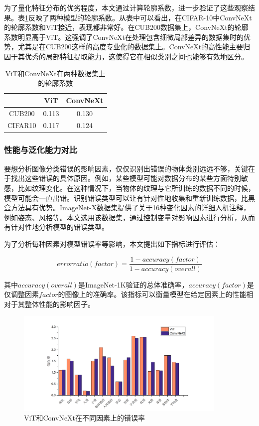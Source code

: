 为了量化特征分布的优劣程度，本文通过计算轮廓系数，进一步验证了这些观察结果。表\ref{tab:Silhouette Coefficient}反映了两种模型的轮廓系数。从表中可以看出，在CIFAR-10中ConvNeXt的轮廓系数和ViT接近，表现都非常好。在CUB200数据集上，ConvNeXt的轮廓系数明显高于ViT。这强调了ConvNeXt在处理包含细微局部差异的数据集时的优势，尤其是在CUB200这样的高度专业化的数据集上。ConvNeXt的高性能主要归因于其优秀的局部特征提取能力，这使得它在相似类别之间也能够有效地区分。

\begin{table}[H]
    \tabcolsep=40pt
    \centering
    \caption{ViT和ConvNeXt在两种数据集上的轮廓系数}
    \label{tab:Silhouette Coefficient}
    \begin{tabular}{c|cc}
          \hline
         &ViT  & ConvNeXt  \\
         \hline
         CUB200 &  0.113 & 0.130   \\
         CIFAR10 & 0.117 & 0.124 \\
         \hline
    \end{tabular}
\end{table}

\subsubsection{性能与泛化能力对比}

要想分析图像分类错误的影响因素，仅仅识别出错误的物体类别远远不够，关键在于找出这些错误的具体原因。例如，某些模型可能对数据分布的某些方面特别敏感，比如纹理变化。在这种情况下，当物体的纹理与它所训练的数据不同的时候，模型可能会一直出错。识别错误类型可以让有针对性地收集和重新训练数据，比黑盒方法具有优势。ImageNet-X数据集提供了关于16种变化因素的详细人机注释，例如姿态、风格等。本文选用该数据集，通过控制变量对影响因素进行分析，从而有针对性地分析模型的错误类型。

为了分析每种因素对模型错误率等影响，本文提出如下指标进行评估：

\begin{equation}
    \label{eq:error ratio}
    error ratio(factor)=\frac{1-accuracy(factor)}{1-accuracy(overall)}
\end{equation}

其中$accuracy(overall)$是ImageNet-1K验证的总体准确率，$accuracy(factor)$是仅调整因素$factor$的图像上的准确率。该指标可以衡量模型在给定因素上的性能相对于其整体性能的影响因子。

\begin{figure}[H]
    \centering
    \includegraphics[width=0.9\textwidth]{pics/不同因素.png}
    \caption{ViT和ConvNeXt在不同因素上的错误率}
    \label{fig:error_ratio}
\end{figure}

